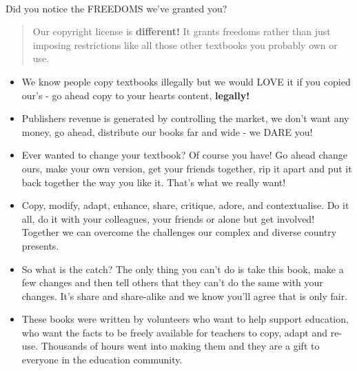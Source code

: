 \documentclass[9pt,a4paper,titlepage,twoside,openright]{extbook}
\begin{document}
\begin{center}
\vspace{1.cm}
\vspace{1.cm}
{\Large \\ Did you notice the FREEDOMS we've granted you?\\}
\vspace{1.cm}
\begin{quotation}{\Large Our copyright license is \textbf{different!} It grants freedoms rather than just imposing
restrictions like all those other textbooks you probably own or use.\\}\end{quotation}
{\large 
\begin{itemize} 
\item We know people copy textbooks illegally but we would LOVE it if you copied our's - 
go ahead copy to your hearts content, \textbf{legally!}
\item Publishers revenue is generated by controlling the market, we don't want any money, 
go ahead, distribute our books far and wide - we DARE you!
\item Ever wanted to change your textbook? Of course you have! Go ahead change ours, 
make your own version, get your friends together, rip it apart and put it back together 
the way you like it. That's what we really want!
\item Copy, modify, adapt, enhance, share, critique, adore, and contextualise. Do it all, 
do it with your colleagues, your friends or alone but get involved! Together we can 
overcome the challenges our complex and diverse country presents.
\item So what is the catch? The only thing you can't do is take this book, make a few changes and then tell others that they can't do the same with your changes. It's share and share-alike and we know you'll agree that is only fair.
\item These books were written by volunteers who want to help support education, who 
want the facts to be freely available for teachers to copy, adapt and re-use. Thousands 
of hours went into making them and they are a gift to everyone in the education community.
\end{itemize}
}
\end{center}



\setlength{\parskip}{1.3ex plus 0.2ex minus 0.2ex}
\setlength{\parindent}{0pt}
\end{document}
